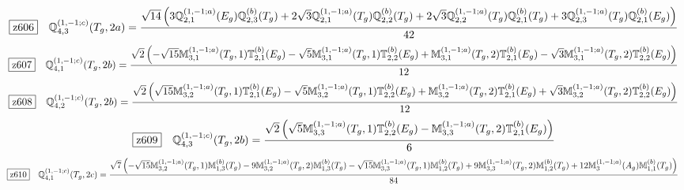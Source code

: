 \documentclass[fleqn,10pt,landscape]{jsarticle}
\begin{document}
\begin{dmath*}
\hspace*{3mm}\fbox{z606}\quad \mathbb{Q}_{4,3}^{(1,-1;c)}(T_{g},2a)=\frac{\sqrt{14} \left(3 \mathbb{Q}_{2,1}^{(1,-1;a)}(E_{g}) \mathbb{Q}_{2,3}^{(b)}(T_{g}) + 2 \sqrt{3} \mathbb{Q}_{2,1}^{(1,-1;a)}(T_{g}) \mathbb{Q}_{2,2}^{(b)}(T_{g}) + 2 \sqrt{3} \mathbb{Q}_{2,2}^{(1,-1;a)}(T_{g}) \mathbb{Q}_{2,1}^{(b)}(T_{g}) + 3 \mathbb{Q}_{2,3}^{(1,-1;a)}(T_{g}) \mathbb{Q}_{2,1}^{(b)}(E_{g})\right)}{42}
\end{dmath*}
\begin{dmath*}
\hspace*{3mm}\fbox{z607}\quad \mathbb{Q}_{4,1}^{(1,-1;c)}(T_{g},2b)=\frac{\sqrt{2} \left(- \sqrt{15} \mathbb{M}_{3,1}^{(1,-1;a)}(T_{g},1) \mathbb{T}_{2,1}^{(b)}(E_{g}) - \sqrt{5} \mathbb{M}_{3,1}^{(1,-1;a)}(T_{g},1) \mathbb{T}_{2,2}^{(b)}(E_{g}) + \mathbb{M}_{3,1}^{(1,-1;a)}(T_{g},2) \mathbb{T}_{2,1}^{(b)}(E_{g}) - \sqrt{3} \mathbb{M}_{3,1}^{(1,-1;a)}(T_{g},2) \mathbb{T}_{2,2}^{(b)}(E_{g})\right)}{12}
\end{dmath*}
\begin{dmath*}
\hspace*{3mm}\fbox{z608}\quad \mathbb{Q}_{4,2}^{(1,-1;c)}(T_{g},2b)=\frac{\sqrt{2} \left(\sqrt{15} \mathbb{M}_{3,2}^{(1,-1;a)}(T_{g},1) \mathbb{T}_{2,1}^{(b)}(E_{g}) - \sqrt{5} \mathbb{M}_{3,2}^{(1,-1;a)}(T_{g},1) \mathbb{T}_{2,2}^{(b)}(E_{g}) + \mathbb{M}_{3,2}^{(1,-1;a)}(T_{g},2) \mathbb{T}_{2,1}^{(b)}(E_{g}) + \sqrt{3} \mathbb{M}_{3,2}^{(1,-1;a)}(T_{g},2) \mathbb{T}_{2,2}^{(b)}(E_{g})\right)}{12}
\end{dmath*}
\begin{dmath*}
\hspace*{3mm}\fbox{z609}\quad \mathbb{Q}_{4,3}^{(1,-1;c)}(T_{g},2b)=\frac{\sqrt{2} \left(\sqrt{5} \mathbb{M}_{3,3}^{(1,-1;a)}(T_{g},1) \mathbb{T}_{2,2}^{(b)}(E_{g}) - \mathbb{M}_{3,3}^{(1,-1;a)}(T_{g},2) \mathbb{T}_{2,1}^{(b)}(E_{g})\right)}{6}
\end{dmath*}
\begin{dmath*}
\hspace*{3mm}\fbox{z610}\quad \mathbb{Q}_{4,1}^{(1,-1;c)}(T_{g},2c)=\frac{\sqrt{7} \left(- \sqrt{15} \mathbb{M}_{3,2}^{(1,-1;a)}(T_{g},1) \mathbb{M}_{1,3}^{(b)}(T_{g}) - 9 \mathbb{M}_{3,2}^{(1,-1;a)}(T_{g},2) \mathbb{M}_{1,3}^{(b)}(T_{g}) - \sqrt{15} \mathbb{M}_{3,3}^{(1,-1;a)}(T_{g},1) \mathbb{M}_{1,2}^{(b)}(T_{g}) + 9 \mathbb{M}_{3,3}^{(1,-1;a)}(T_{g},2) \mathbb{M}_{1,2}^{(b)}(T_{g}) + 12 \mathbb{M}_{3}^{(1,-1;a)}(A_{g}) \mathbb{M}_{1,1}^{(b)}(T_{g})\right)}{84}
\end{dmath*}
\end{document}
